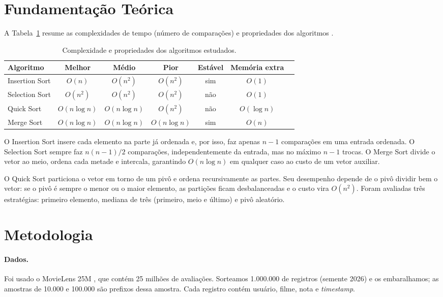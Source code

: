 \documentclass[12pt]{article}
\begin{document}
\section{Fundamenta\c{c}\~ao Te\'orica}

A Tabela~\ref{tab:teoria} resume as complexidades de tempo (n\'umero de compara\c{c}\~oes) e propriedades dos algoritmos \cite{cormen2012,ziviani2007,knuth1998}.

\begin{table}[ht]
\centering
\caption{Complexidade e propriedades dos algoritmos estudados.}
\label{tab:teoria}
\begin{tabular}{lcccccc}
\toprule
Algoritmo & Melhor & M\'edio & Pior & Est\'avel & Mem\'oria extra \\
\midrule
Insertion Sort & $O(n)$ & $O(n^2)$ & $O(n^2)$ & sim & $O(1)$ \\
Selection Sort & $O(n^2)$ & $O(n^2)$ & $O(n^2)$ & n\~ao & $O(1)$ \\
Quick Sort & $O(n\log n)$ & $O(n\log n)$ & $O(n^2)$ & n\~ao & $O(\log n)$ \\
Merge Sort & $O(n\log n)$ & $O(n\log n)$ & $O(n\log n)$ & sim & $O(n)$ \\
\bottomrule
\end{tabular}
\end{table}

O Insertion Sort insere cada elemento na parte j\'a ordenada e, por isso, faz apenas $n-1$ compara\c{c}\~oes em uma entrada ordenada. O Selection Sort sempre faz $n(n-1)/2$ compara\c{c}\~oes, independentemente da entrada, mas no m\'aximo $n-1$ trocas. O Merge Sort divide o vetor ao meio, ordena cada metade e intercala, garantindo $O(n\log n)$ em qualquer caso ao custo de um vetor auxiliar.

O Quick Sort \cite{hoare1962} particiona o vetor em torno de um piv\^o e ordena recursivamente as partes. Seu desempenho depende de o piv\^o dividir bem o vetor: se o piv\^o \'e sempre o menor ou o maior elemento, as parti\c{c}\~oes ficam desbalanceadas e o custo vira $O(n^2)$. Foram avaliadas tr\^es estrat\'egias: primeiro elemento, mediana de tr\^es (primeiro, meio e \'ultimo) e piv\^o aleat\'orio.

\section{Metodologia}

\paragraph{Dados.} Foi usado o MovieLens 25M \cite{harper2015}, que cont\'em 25 milh\~oes de avalia\c{c}\~oes. Sorteamos 1.000.000 de registros (semente 2026) e os embaralhamos; as amostras de 10.000 e 100.000 s\~ao prefixos dessa amostra. Cada registro cont\'em usu\'ario, filme, nota e \emph{timestamp}.
\end{document}
